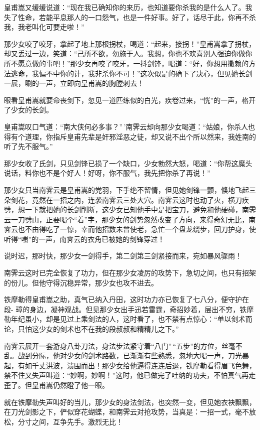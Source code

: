 \documentclass[12pt,oneside]{book}
\begin{document}
皇甫嵩又缓缓说道：``现在我已确知你的来历，也知道要你杀我的是什么人了。我失了性命，若能平息那人的一口怨气，也是一件好事。好了，话尽于此，你再不杀我，我老叫化可要走啦！''

那少女咬了咬牙，拿起了地上那根拐杖，喝道：``起来，接拐！''皇甫嵩拿了拐杖，却又丢过一边，笑道：``己所不欲，勿施于人。我想，你也不欢喜别人强迫你做你所不愿意做的事吧！''那少女再咬了咬牙，一抖剑锋，喝道：``好，你想用撒赖的方法逃命，我偏不中你的计，我非杀你不可！''这次似是的确下了决心，但见她长剑一展，唰的一声，立即向皇甫嵩的胸膛刺去！

眼看皇甫嵩就要命丧剑下，忽见一道匹练似的白光，疾卷过来，``恍''的一声，格开了少女的长剑。

皇甫嵩叹口气道：``南大侠何必多事？''\,'南霁云却向那少女喝道：``姑娘，你杀人也得有个道理，你指斥皇甫先辈是奸邪淫恶之徒，却又说不出个所以然来，我姓南的听了先不服气。''

那少女收了氏剑，只见剑锋已损了一个缺口，少女勃然大怒，喝道：``你帮这魔头说话，料你也不是个好人！好呀，你不服气，我先把你杀了再说！''

那少女只当南霁云是皇甫嵩的党羽，下手绝不留情，但见她剑锋一颤，倏地飞起三朵剑花，竟然在一招之内，连袭南霁云三处大穴。南霁云这时也动了火，横刀疾劈，想一下就把她的长剑削断，这少女已知他手中是把宝刀，避免和他硬碰，南霁云一刀劈山，正要喝个``着''字，那少女的剑势忽然改变了方向，来得奇幻无比，南霁云也不由得吃了一惊，幸而他招数未曾使老，急忙一个盘龙绕步，回刀护身，使听得``嗤''的一声，南霁云的衣角已被她的剑锋穿过！

说时迟，那时快，那少女一剑得手，第二剑第三剑紧接而来，宛如暴风骤雨！

南霁云这时已完全恢复了功力，但在那少女凌厉的攻势下，急切之间，也只有招架的份儿。但他守得沉稳异常，那少女也攻不进去。

铁摩勒得皇甫嵩之助，真气已纳入丹田，这时功力亦已恢复了七八分，便守护在段-
璋的身边，凝神观战。但见那少女出手迅若雷霆，奇招妙着，层出不穷，铁摩勒年纪虽小，却是见过上乘剑法的人，这时看了，也不禁有点惊心：``单以剑术而论，只怕这少女的剑术也不在我的段叔叔和精精儿之下。''

南霁云展开一套游身八卦刀法，身法步法紧守着``八门''\,``五步''的方位，丝毫不乱。战到分际，他对少女的剑术路数，已渐渐有些熟悉，忽地大喝一声，刀光暴起，有如千丈洪波，溃围而出！那少女给他逼得连连后退，铁摩勒看得眉飞色舞，禁不住又失声叫道：``妙啊，妙啊！''这时，他已做完了吐纳的功夫，不怕真气再走歪了。但皇甫嵩仍然瞪了他一眼。

就在铁摩勒失声叫好的当儿，那少女的身法剑法，也突然一变，但见她衣袂飘飘，在刀光剑影之下，俨似穿花蝴蝶，和南霁云对抢攻势，当真是：一招一式，毫不放松，分寸之间，互争先手。激烈无比！
\end{document}
